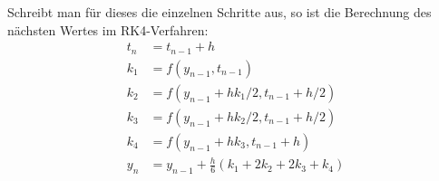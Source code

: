 \documentclass{scrartcl}
\begin{document}
Schreibt man für dieses die einzelnen Schritte aus, so ist die Berechnung des nächsten Wertes im RK4-Verfahren:
\begin{equation}
\label{eq:RK4}
	\begin{aligned}
		t_n &= t_{n-1} + h \\[0.3cm]
		k_1 &= f\left(y_{n-1},{} t_{n-1}\right) \\
		k_2 &= f\left(y_{n-1} + hk_1/2,{} t_{n-1} + h/2\right) \\
		k_3 &= f\left(y_{n-1} + hk_2/2,{} t_{n-1} + h/2\right) \\
		k_4 &= f\left(y_{n-1} + hk_3,{} t_{n-1} + h\right) \\[0.3cm]
		y_n &= y_{n-1} + \tfrac{h}{6}\left(k_1 + 2k_2 + 2k_3 + k_4 \right)
	\end{aligned}
\end{equation}
\end{document}
